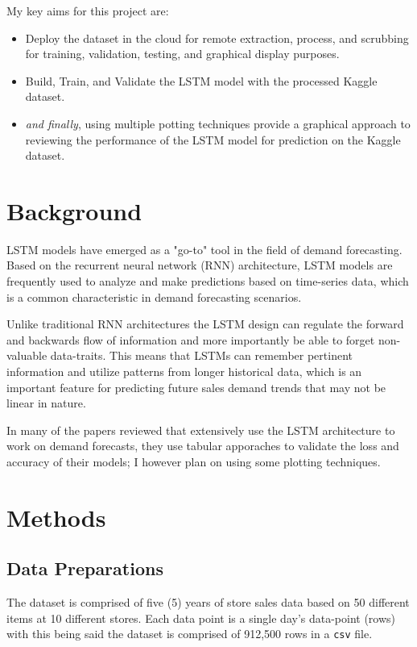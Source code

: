 \documentclass[10pt, journal, letterpaper, compsoc]{IEEEtran}
\begin{document}
My key aims for this project are:
\begin{itemize}
    \item Deploy the dataset in the cloud for remote extraction, process, and scrubbing for training, validation, testing, and graphical display purposes.
    \item Build, Train, and Validate the LSTM model with the processed Kaggle\cite{demand-forecasting-kernels-only} dataset.
    \item \textit{and finally}, using multiple potting techniques provide a graphical approach to reviewing the performance of the LSTM model for prediction on the Kaggle\cite{demand-forecasting-kernels-only} dataset.
\end{itemize}

\section{Background}
LSTM models have emerged as a "go-to" tool\cite{pharma-sales-forecast-lstm, predicting-sales-lstm} in the field of demand forecasting. Based on the recurrent neural network (RNN) architecture, LSTM models are frequently used\cite{pharma-sales-forecast-lstm} to analyze and make predictions based on time-series data, which is a common characteristic in demand forecasting scenarios.

Unlike traditional RNN architectures the LSTM design can regulate the forward and backwards flow of information and more importantly be able to forget non-valuable data-traits. This means that LSTMs can remember pertinent information and utilize patterns from longer\cite{predicting-sales-lstm} historical data, which is an important feature for predicting future sales demand trends that may not be linear in nature\cite{improved-sales-forecasting}.

In many of the papers reviewed\cite{pharma-sales-forecast-lstm, predicting-sales-lstm} that extensively use the LSTM architecture to work on demand forecasts, they use tabular apporaches to validate the loss and accuracy of their models; I however  plan on using some plotting techniques.


\section{Methods}
\subsection{Data Preparations}
The dataset is comprised of five (5) years of store sales data based on 50 different items at 10 different stores. Each data point is a single day's data-point (rows) with this being said the dataset is comprised of 912,500 rows in a \texttt{csv} file.
\end{document}
